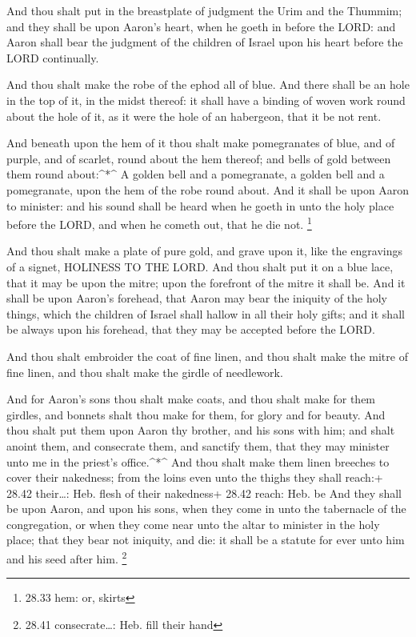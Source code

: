  And thou shalt put in the breastplate of judgment the Urim
and the Thummim; and they shall be upon Aaron's heart, when he goeth in
before the LORD: and Aaron shall bear the judgment of the children of
Israel upon his heart before the LORD continually.

 And thou shalt make the robe of the ephod all of blue.
 And there shall be an hole in the top of it, in the midst
thereof: it shall have a binding of woven work round about the hole of
it, as it were the hole of an habergeon, that it be not rent.

 And beneath upon the hem of it thou shalt make
pomegranates of blue, and of purple, and of scarlet, round about the hem
thereof; and bells of gold between them round about:\^{}*\^{}
 A golden bell and a pomegranate, a golden bell and a
pomegranate, upon the hem of the robe round about.  And it
shall be upon Aaron to minister: and his sound shall be heard when he
goeth in unto the holy place before the LORD, and when he cometh out,
that he die not. \footnote{28.33 hem: or, skirts}

 And thou shalt make a plate of pure gold, and grave upon
it, like the engravings of a signet, HOLINESS TO THE LORD. 
And thou shalt put it on a blue lace, that it may be upon the mitre;
upon the forefront of the mitre it shall be.  And it shall
be upon Aaron's forehead, that Aaron may bear the iniquity of the holy
things, which the children of Israel shall hallow in all their holy
gifts; and it shall be always upon his forehead, that they may be
accepted before the LORD.

 And thou shalt embroider the coat of fine linen, and thou
shalt make the mitre of fine linen, and thou shalt make the girdle of
needlework.

 And for Aaron's sons thou shalt make coats, and thou shalt
make for them girdles, and bonnets shalt thou make for them, for glory
and for beauty.  And thou shalt put them upon Aaron thy
brother, and his sons with him; and shalt anoint them, and consecrate
them, and sanctify them, that they may minister unto me in the priest's
office.\^{}*\^{}  And thou shalt make them linen breeches
to cover their nakedness; from the loins even unto the thighs they shall
reach:+ 28.42 their\ldots: Heb. flesh of their nakedness+ 28.42 reach:
Heb. be  And they shall be upon Aaron, and upon his sons,
when they come in unto the tabernacle of the congregation, or when they
come near unto the altar to minister in the holy place; that they bear
not iniquity, and die: it shall be a statute for ever unto him and his
seed after him. \footnote{28.41 consecrate\ldots: Heb. fill their hand}

